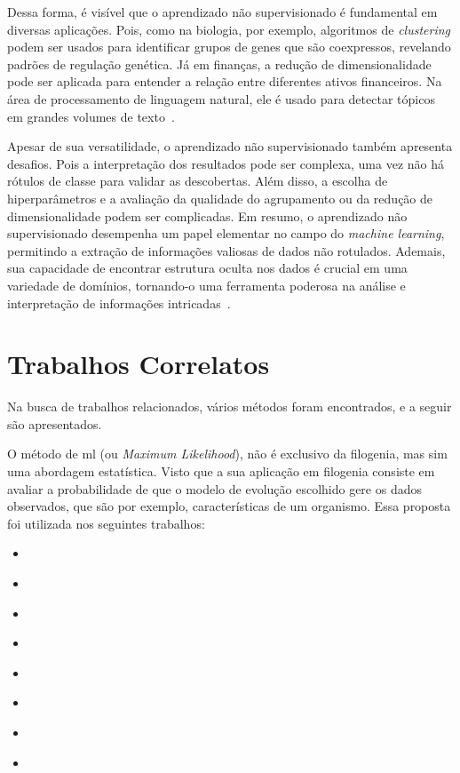Dessa forma, é visível que o aprendizado não supervisionado é fundamental em diversas aplicações. Pois, como na biologia, por exemplo, algoritmos de \textit{clustering} podem ser usados para identificar grupos de genes que são coexpressos, revelando padrões de regulação genética. Já em finanças, a redução de dimensionalidade pode ser aplicada para entender a relação entre diferentes ativos financeiros. Na área de processamento de linguagem natural, ele é usado para detectar tópicos em grandes volumes de texto~\cite{bioinformatics_david_2004}.


Apesar de sua versatilidade, o aprendizado não supervisionado também apresenta desafios. Pois a interpretação dos resultados pode ser complexa, uma vez não há rótulos de classe para validar as descobertas. Além disso, a escolha de hiperparâmetros e a avaliação da qualidade do agrupamento ou da redução de dimensionalidade podem ser complicadas.
Em resumo, o aprendizado não supervisionado desempenha um papel elementar no campo do \textit{machine learning}, permitindo a extração de informações valiosas de dados não rotulados. Ademais, sua capacidade de encontrar estrutura oculta nos dados é crucial em uma variedade de domínios, tornando-o uma ferramenta poderosa na análise e interpretação de informações intricadas~\cite{learning_kernels_scholkopf_2002}.

\section{Trabalhos Correlatos}

Na busca de trabalhos relacionados, vários métodos foram encontrados, e a seguir são apresentados.

O método de \gls{ml} (ou \textit{Maximum Likelihood}), não é exclusivo da filogenia, mas sim uma abordagem estatística. Visto que a sua aplicação em filogenia consiste em avaliar a probabilidade de que o modelo de evolução escolhido gere os dados observados, que são por exemplo, características de um organismo. Essa proposta foi utilizada nos seguintes trabalhos:
\begin{itemize}
  \item \textit{\citeauthor{behl_threat_2022}}
  \item \textit{\citeauthor{fall_genetic_diversity_2021}}
  \item \textit{\citeauthor{shabbir_comprehensive_2020}}
  \item \textit{\citeauthor{hudu_hepatitis_2018}}
  \item \textit{\citeauthor{sallard_tracing_2021}}
  \item \textit{\citeauthor{paez-espino_diversity_evolution_2019}}
  \item \textit{\citeauthor{tang_evolutionary_2021}}
  \item \textit{\citeauthor{cho_analysis_2022}}
\end{itemize}

